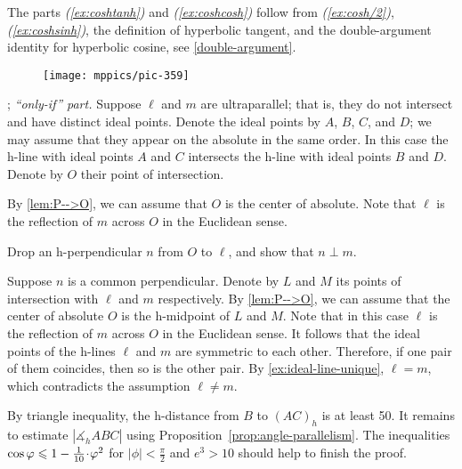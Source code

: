 The parts \textit{(\ref{ex:coshtanh})} and \textit{(\ref{ex:coshcosh})} follow from \textit{(\ref{ex:cosh/2})}, \textit{(\ref{ex:coshsinh})}, the definition of hyperbolic tangent, and the double-argument identity for hyperbolic cosine, see \ref{double-argument}.



\setcounter{eqtn}{0}

{

\begin{wrapfigure}{r}{34mm}
\vskip-5mm
\centering
\texttt{[image: mppics/pic-359]}
\end{wrapfigure}

\parbf{\ref{ex:ultra-parallel}}; \textit{``only-if'' part.} Suppose $\ell$ and $m$ are ultraparallel; that is, they do not intersect and have distinct ideal points.
Denote the ideal points by $A$, $B$, $C$, and $D$;
we may assume that they appear on the absolute in the same order.
In this case the h-line with ideal points $A$ and $C$ intersects the h-line with ideal points $B$ and $D$.
Denote by $O$ their point of intersection.

By \ref{lem:P-->O}, we can assume that $O$ is the center of absolute.
Note that $\ell$ is the reflection of $m$ across $O$ in the Euclidean sense.

}

Drop an h-perpendicular $n$ from $O$ to $\ell$, and
show that $n\perp m$.


Suppose $n$ is a common perpendicular.
Denote by $L$ and $M$ its points of intersection with $\ell$ and $m$ respectively.
By \ref{lem:P-->O}, we can assume that the center of absolute $O$ is the h-midpoint of $L$ and $M$.
Note that in this case $\ell$ is the reflection of $m$ across $O$ in the Euclidean sense.
It follows that the ideal points of the h-lines $\ell$ and $m$ are symmetric to each other.
Therefore, if one pair of them coincides, then so is the other pair. 
By \ref{ex:ideal-line-unique}, $\ell=m$, which contradicts the assumption $\ell\ne m$.



By triangle inequality, the h-distance from $B$ to $(AC)_h$ is at least 50.
It remains to estimate $|\measuredangle_h ABC|$ using Proposition~\ref{prop:angle-parallelism}.
The inequalities $\cos\phi\z\le 1-\tfrac1{10}\cdot\phi^2$ for $|\phi|<\tfrac\pi2$ and $e^3>10$ should help to finish the proof.

